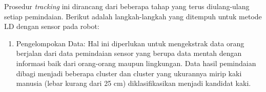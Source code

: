     Prosedur \textit{tracking} ini dirancang dari beberapa tahap yang terus diulang-ulang setiap pemindaian. Berikut adalah langkah-langkah yang ditempuh untuk metode LD dengan sensor pada robot\cite{c1b}:
    \begin{enumerate}
        \item Pengelompokan Data: Hal ini diperlukan untuk mengekstrak data orang berjalan dari data pemindaian sensor yang berupa data mentah dengan informasi baik dari orang-orang maupun lingkungan. Data hasil pemindaian dibagi menjadi beberapa cluster dan cluster yang ukurannya mirip kaki manusia (lebar kurang dari 25 cm) diklasifikasikan menjadi kandidat kaki.


\end{enumerate}

